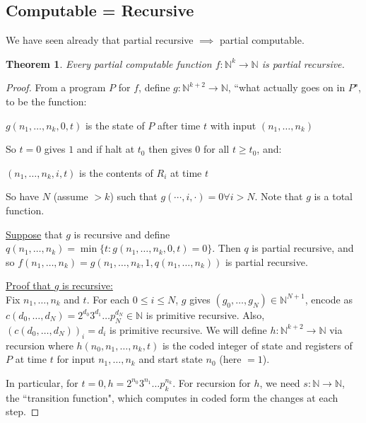 \documentclass[10pt,a4paper]{article}
\newcommand{\N}{\mathbb{N}}
\newtheorem{thm15}[t1]{Theorem}
\begin{document}
\subsection*{Computable = Recursive}
We have seen already that partial recursive $\implies$ partial computable.
\begin{thm15}
Every partial computable function $f:\N^k \rightarrow \N$ is partial recursive.
\end{thm15}
\begin{proof}
From a program $P$ for $f$, define $g:\N^{k+2}\rightarrow \N$, ``what actually goes on in $P$", to be the function:
\begin{center}
$g(n_1,\ldots,n_k,0,t) $ is the state of $P$ after time $t$ with input $(n_1,\ldots,n_k)$
\end{center}
So $t=0$ gives $1$ and if halt at $t_0$ then gives $0$ for all $t \geq t_0$, and:
\begin{center}
$(n_1, \ldots, n_k, i, t)$ is the contents of $R_i$ at time $t$
\end{center}
So have $N$ (assume $>k$) such that $g(\cdots, i, \cdot) = 0 \forall i>N$. Note that $g$ is a total function.

\underline{Suppose} that $g$ is recursive and define $q(n_1,\ldots, n_k) = \min\{t: g(n_1,\ldots,n_k,0,t)=0\}$. Then $q$ is partial recursive, and so $f(n_1, \ldots, n_k) = g(n_1, \ldots, n_k, 1, q(n_1, \ldots, n_k))$ is partial recursive.

\underline{Proof that $g$ is recursive:}\\
Fix $n_1, \ldots, n_k$ and $t$. For each $0\leq i \leq N$, $g$ gives $(g_0, \ldots, g_N) \in \N^{N+1}$, encode as $c(d_0, \ldots, d_N) = 2^{d_0}3^{d_1}\ldots p_N^{d_N} \in \N$ is primitive recursive. Also, $(c(d_0, \ldots, d_N))_i = d_i$ is primitive recursive. We will define $h:\N^{k+2}\rightarrow \N$ via recursion where $h(n_0, n_1, \ldots, n_k, t)$ is the coded integer of state and registers of $P$ at time $t$ for input $n_1, \ldots, n_k$ and start state $n_0$ (here $=1$).

In particular, for $t=0, h=2^{n_0}3^{n_1}\ldots p_k^{n_k}$. For recursion for $h$, we need $s:\N\rightarrow\N$, the ``transition function", which computes in coded form the changes at each step.
\end{proof}
\end{document}
